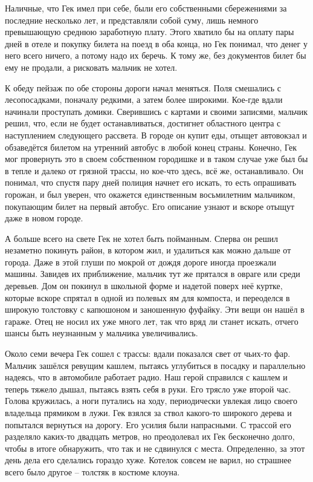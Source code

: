 \documentclass[
  a5paperpaper,
  DIV=11,
  numbers=noendperiod]{scrreprt}
\begin{document}
Наличные, что Гек имел при себе, были его собственными сбережениями за
последние несколько лет, и представляли собой суму, лишь немного
превышающую среднюю заработную плату. Этого хватило бы на оплату пары
дней в отеле и покупку билета на поезд в оба конца, но Гек понимал, что
денег у него всего ничего, а потому надо их беречь. К тому же, без
документов билет бы ему не продали, а рисковать мальчик не хотел.

К обеду пейзаж по обе стороны дороги начал меняться. Поля смешались с
лесопосадками, поначалу редкими, а затем более широкими. Кое-где вдали
начинали проступать домики. Сверившись с картами и своими записями,
мальчик решил, что, если не будет останавливаться, достигнет областного
центра с наступлением следующего рассвета. В городе он купит еды, отыщет
автовокзал и обзаведётся билетом на утренний автобус в любой конец
страны. Конечно, Гек мог провернуть это в своем собственном городишке и
в таком случае уже был бы в тепле и далеко от грязной трассы, но кое-что
здесь, всё же, останавливало. Он понимал, что спустя пару дней полиция
начнет его искать, то есть опрашивать горожан, и был уверен, что
окажется единственным восьмилетним мальчиком, покупающим билет на первый
автобус. Его описание узнают и вскоре отыщут даже в новом городе.

А больше всего на свете Гек не хотел быть пойманным. Сперва он решил
незаметно покинуть район, в котором жил, и удалиться как можно дальше от
города. Даже в этой глуши по мокрой от дождя дороге иногда проезжали
машины. Завидев их приближение, мальчик тут же прятался в овраге или
среди деревьев. Дом он покинул в школьной форме и надетой поверх неё
куртке, которые вскоре спрятал в одной из полевых ям для компоста, и
переоделся в широкую толстовку с капюшоном и заношенную фуфайку. Эти
вещи он нашёл в гараже. Отец не носил их уже много лет, так что вряд ли
станет искать, отчего шансы быть неузнанным у мальчика увеличивались.

Около семи вечера Гек сошел с трассы: вдали показался свет от чьих-то
фар. Мальчик зашёлся ревущим кашлем, пытаясь углубиться в посадку и
параллельно надеясь, что в автомобиле работает радио. Наш герой
справился с кашлем и теперь тяжело дышал, пытаясь взять себя в руки. Его
трясло уже второй час. Голова кружилась, а ноги путались на ходу,
периодически увлекая лицо своего владельца прямиком в лужи. Гек взялся
за ствол какого-то широкого дерева и попытался вернуться на дорогу. Его
усилия были напрасными. С трассой его разделяло каких-то двадцать
метров, но преодолевал их Гек бесконечно долго, чтобы в итоге
обнаружить, что так и не сдвинулся с места. Определенно, за этот день
дела его сделались гораздо хуже. Котелок совсем не варил, но страшнее
всего было другое -- толстяк в костюме клоуна.
\end{document}

